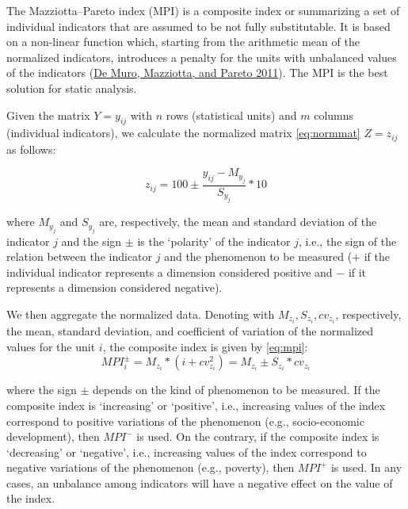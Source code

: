 \documentclass[
]{article}
\begin{document}
The Mazziotta--Pareto index (MPI) is a composite index or summarizing a
set of individual indicators that are assumed to be not fully
substitutable. It is based on a non-linear function which, starting from
the arithmetic mean of the normalized indicators, introduces a penalty
for the units with unbalanced values of the indicators
(\protect\hyperlink{ref-de2011composite}{De Muro, Mazziotta, and Pareto 2011}). The MPI is the best solution for static analysis.

Given the matrix \(Y=y_{ij}\) with \(n\) rows (statistical units) and \(m\)
columns (individual indicators), we calculate the normalized matrix \eqref{eq:normmat}
\(Z=z_{ij}\) as follows:

\begin{equation}
z_{ij}=100\pm\frac{y_{ij}-M_{y_j}}{S_{y_j}}*10
\label{eq:normmat}
\end{equation}

where \(M_{y_j}\) and \(S_{y_j}\) are, respectively, the mean and standard
deviation of the indicator \(j\) and the sign \(\pm\) is the `polarity' of
the indicator \(j\), i.e., the sign of the relation between the indicator
\(j\) and the phenomenon to be measured (\(+\) if the individual indicator
represents a dimension considered positive and \(-\) if it represents a
dimension considered negative).

We then aggregate the normalized data. Denoting with
\(M_{z_i},S_{z_i},cv_{z_i}\), respectively, the mean, standard deviation,
and coefficient of variation of the normalized values for the unit \(i\),
the composite index is given by \eqref{eq:mpi}:
\begin{equation}
MPI^\pm_i= M_{z_i}*(i+cv^2_{z_i})=M_{z_i}\pm S_{z_i}*cv_{z_i}
\label{eq:mpi}
\end{equation}

where the sign \(\pm\) depends on the kind of phenomenon to be
measured. If the composite index is `increasing' or `positive', i.e.,
increasing values of the index correspond to positive variations of the
phenomenon (e.g., socio-economic development), then \(MPI^-\) is used. On
the contrary, if the composite index is `decreasing' or `negative',
i.e., increasing values of the index correspond to negative variations
of the phenomenon (e.g., poverty), then \(MPI^+\) is used. In any cases,
an unbalance among indicators will have a negative effect on the value
of the index.
\end{document}
